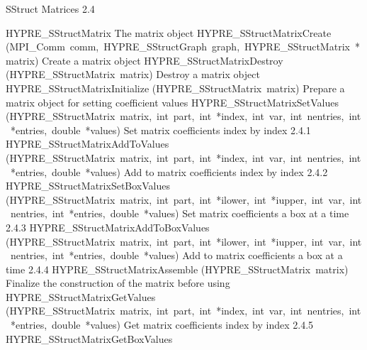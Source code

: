\documentclass{article}
\begin{document}
\begin{cxxentry}
\begin{cxxentry}
\begin{cxxfunction}
\begin{cxxdoc}
\end{cxxdoc}
\end{cxxfunction}
\end{cxxentry}
\begin{cxxentry}
{}
        {SStruct Matrices}
        {}
        {
}
        {2.4}
\begin{cxxnames}
        {HYPRE\_SStructMatrix}
        {}
        {
The matrix object}
        {}
\label{cxx.2.4.11}
        {HYPRE\_SStructMatrixCreate}
        {(MPI\_Comm\ comm,\ HYPRE\_SStructGraph\ graph,\ HYPRE\_SStructMatrix\ *matrix)}
        {
Create a matrix object}
        {}
\label{cxx.2.4.12}
        {HYPRE\_SStructMatrixDestroy}
        {(HYPRE\_SStructMatrix\ matrix)}
        {
Destroy a matrix object}
        {}
\label{cxx.2.4.13}
        {HYPRE\_SStructMatrixInitialize}
        {(HYPRE\_SStructMatrix\ matrix)}
        {
Prepare a matrix object for setting coefficient values}
        {}
\label{cxx.2.4.14}
        {HYPRE\_SStructMatrixSetValues}
        {(HYPRE\_SStructMatrix\ matrix,\ int\ part,\ int\ *index,\ int\ var,\ int\ nentries,\ int\ *entries,\ double\ *values)}
        {
Set matrix coefficients index by index}
        {2.4.1}
        {HYPRE\_SStructMatrixAddToValues}
        {(HYPRE\_SStructMatrix\ matrix,\ int\ part,\ int\ *index,\ int\ var,\ int\ nentries,\ int\ *entries,\ double\ *values)}
        {
Add to matrix coefficients index by index}
        {2.4.2}
        {HYPRE\_SStructMatrixSetBoxValues}
        {(HYPRE\_SStructMatrix\ matrix,\ int\ part,\ int\ *ilower,\ int\ *iupper,\ int\ var,\ int\ nentries,\ int\ *entries,\ double\ *values)}
        {
Set matrix coefficients a box at a time}
        {2.4.3}
        {HYPRE\_SStructMatrixAddToBoxValues}
        {(HYPRE\_SStructMatrix\ matrix,\ int\ part,\ int\ *ilower,\ int\ *iupper,\ int\ var,\ int\ nentries,\ int\ *entries,\ double\ *values)}
        {
Add to matrix coefficients a box at a time}
        {2.4.4}
        {HYPRE\_SStructMatrixAssemble}
        {(HYPRE\_SStructMatrix\ matrix)}
        {
Finalize the construction of the matrix before using}
        {}
\label{cxx.2.4.15}
        {HYPRE\_SStructMatrixGetValues}
        {(HYPRE\_SStructMatrix\ matrix,\ int\ part,\ int\ *index,\ int\ var,\ int\ nentries,\ int\ *entries,\ double\ *values)}
        {
Get matrix coefficients index by index}
        {2.4.5}
        {HYPRE\_SStructMatrixGetBoxValues}

\end{cxxnames}
\end{cxxentry}
\end{cxxentry}
\end{document}

